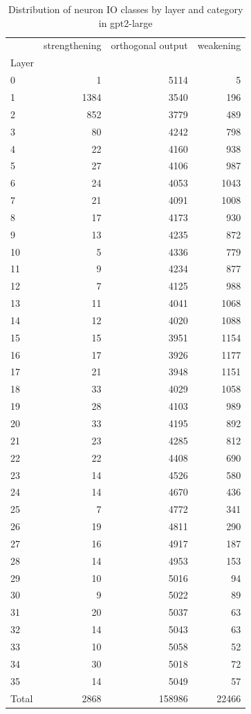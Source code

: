 \begin{table}
\caption{Distribution of neuron IO classes by layer and category in gpt2-large}
\label{tab:gpt2-large}
\begin{tabular}{lrrr}
 & strengthening & orthogonal output & weakening \\
Layer &  &  &  \\
0 & 1 & 5114 & 5 \\
1 & 1384 & 3540 & 196 \\
2 & 852 & 3779 & 489 \\
3 & 80 & 4242 & 798 \\
4 & 22 & 4160 & 938 \\
5 & 27 & 4106 & 987 \\
6 & 24 & 4053 & 1043 \\
7 & 21 & 4091 & 1008 \\
8 & 17 & 4173 & 930 \\
9 & 13 & 4235 & 872 \\
10 & 5 & 4336 & 779 \\
11 & 9 & 4234 & 877 \\
12 & 7 & 4125 & 988 \\
13 & 11 & 4041 & 1068 \\
14 & 12 & 4020 & 1088 \\
15 & 15 & 3951 & 1154 \\
16 & 17 & 3926 & 1177 \\
17 & 21 & 3948 & 1151 \\
18 & 33 & 4029 & 1058 \\
19 & 28 & 4103 & 989 \\
20 & 33 & 4195 & 892 \\
21 & 23 & 4285 & 812 \\
22 & 22 & 4408 & 690 \\
23 & 14 & 4526 & 580 \\
24 & 14 & 4670 & 436 \\
25 & 7 & 4772 & 341 \\
26 & 19 & 4811 & 290 \\
27 & 16 & 4917 & 187 \\
28 & 14 & 4953 & 153 \\
29 & 10 & 5016 & 94 \\
30 & 9 & 5022 & 89 \\
31 & 20 & 5037 & 63 \\
32 & 14 & 5043 & 63 \\
33 & 10 & 5058 & 52 \\
34 & 30 & 5018 & 72 \\
35 & 14 & 5049 & 57 \\
Total & 2868 & 158986 & 22466 \\
\end{tabular}
\end{table}
